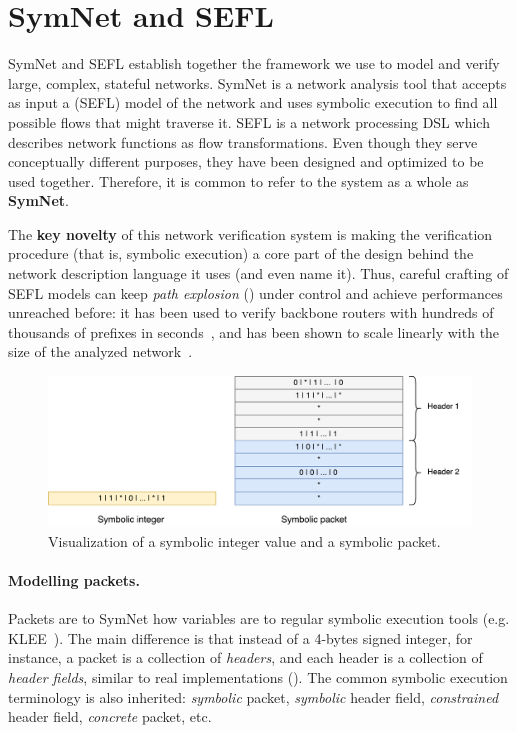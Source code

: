 \section{SymNet and SEFL}\label{sec:symnet-sefl}

SymNet and SEFL establish together the framework we use to model and verify
large, complex, stateful networks. SymNet is a network analysis tool that
accepts as input a (SEFL) model of the network and uses symbolic execution to
find all possible flows that might traverse it.  SEFL is a network processing
DSL which describes network functions as flow transformations.  Even though
they serve conceptually different purposes, they have been designed and
optimized to be used together.  Therefore, it is common to refer to the system
as a whole as \textbf{SymNet}.

The \textbf{key novelty} of this network verification system is making the
verification procedure (that is, symbolic execution) a core part of the design
behind the network description language it uses (and even name it).  Thus,
careful crafting of SEFL models can keep \emph{path explosion}
() under control and achieve
performances unreached before: it has been used to verify backbone routers with
hundreds of thousands of prefixes in seconds~\cite{stoenescu2016symnet}, and
has been shown to scale linearly with the size of the analyzed
network~\cite{stoenescu2013symnet}.

\begin{figure}[h]
  \centering
  \captionsetup{justification=centering}
  \includegraphics[scale=0.6]{assets/img/symbolic-packet}
  \caption{Visualization of a symbolic integer value and a symbolic packet.}
  \label{fig:symbolic-packet}
\end{figure}

\paragraph{Modelling packets.}
Packets are to SymNet how variables are to regular symbolic execution tools
(e.g. KLEE~\cite{cadar2008klee}). The main difference is that instead of a
4-bytes signed integer, for instance, a packet is a collection of
\emph{headers}, and each header is a collection of \emph{header fields},
similar to real implementations ().
The common symbolic execution terminology is also inherited: \emph{symbolic}
packet, \emph{symbolic} header field, \emph{constrained} header field,
\emph{concrete} packet, etc.

